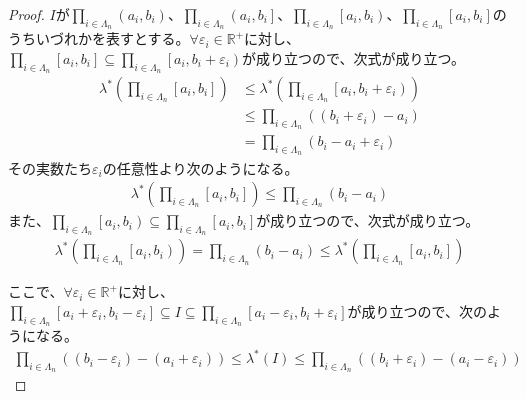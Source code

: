 \documentclass[dvipdfmx]{jsarticle}
\begin{document}
\begin{proof}
$I$が$\prod_{i \in \varLambda_{n}} \left( a_{i},b_{i} \right)$、$\prod_{i \in \varLambda_{n}} \left( a_{i},b_{i} \right]$、$\prod_{i \in \varLambda_{n}} \left[ a_{i},b_{i} \right)$、$\prod_{i \in \varLambda_{n}} \left[ a_{i},b_{i} \right]$のうちいづれかを表すとする。$\forall\varepsilon_{i} \in \mathbb{R}^{+}$に対し、$\prod_{i \in \varLambda_{n}} \left[ a_{i},b_{i} \right] \subseteq \prod_{i \in \varLambda_{n}} \left[ a_{i},b_{i} + \varepsilon_{i} \right)$が成り立つので、次式が成り立つ。
\begin{align*}
\lambda^{*}\left( \prod_{i \in \varLambda_{n}} \left[ a_{i},b_{i} \right] \right) &\leq \lambda^{*}\left( \prod_{i \in \varLambda_{n}} \left[ a_{i},b_{i} + \varepsilon_{i} \right) \right)\\
&\leq \prod_{i \in \varLambda_{n}} \left( \left( b_{i} + \varepsilon_{i} \right) - a_{i} \right)\\
&= \prod_{i \in \varLambda_{n}} \left( b_{i} - a_{i} + \varepsilon_{i} \right)
\end{align*}
その実数たち$\varepsilon_{i}$の任意性より次のようになる。
\begin{align*}
\lambda^{*}\left( \prod_{i \in \varLambda_{n}} \left[ a_{i},b_{i} \right] \right) \leq \prod_{i \in \varLambda_{n}} \left( b_{i} - a_{i} \right)
\end{align*}
また、$\prod_{i \in \varLambda_{n}} \left[ a_{i},b_{i} \right) \subseteq \prod_{i \in \varLambda_{n}} \left[ a_{i},b_{i} \right]$が成り立つので、次式が成り立つ。
\begin{align*}
\lambda^{*}\left( \prod_{i \in \varLambda_{n}} \left[ a_{i},b_{i} \right) \right) = \prod_{i \in \varLambda_{n}} \left( b_{i} - a_{i} \right) \leq \lambda^{*}\left( \prod_{i \in \varLambda_{n}} \left[ a_{i},b_{i} \right] \right)
\end{align*}\par
ここで、$\forall\varepsilon_{i} \in \mathbb{R}^{+}$に対し、$\prod_{i \in \varLambda_{n}} \left[ a_{i} + \varepsilon_{i},b_{i} - \varepsilon_{i} \right] \subseteq I \subseteq \prod_{i \in \varLambda_{n}} \left[ a_{i} - \varepsilon_{i},b_{i} + \varepsilon_{i} \right]$が成り立つので、次のようになる。
\begin{align*}
\prod_{i \in \varLambda_{n}} \left( \left( b_{i} - \varepsilon_{i} \right) - \left( a_{i} + \varepsilon_{i} \right) \right) \leq \lambda^{*}(I) \leq \prod_{i \in \varLambda_{n}} \left( \left( b_{i} + \varepsilon_{i} \right) - \left( a_{i} - \varepsilon_{i} \right) \right)
\end{align*}

\end{proof}
\end{document}
